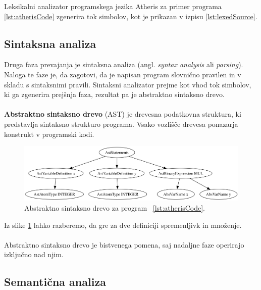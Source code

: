 \documentclass[a4paper, 12p]{book}
\begin{document}
Leksikalni analizator programskega jezika Atheris za primer programa \ref{lst:atherisCode} zgenerira tok simbolov, kot je prikazan v izpisu \ref{lst:lexedSource}.

\subsection{Sintaksna analiza}

Druga faza prevajanja je sintaksna analiza (angl. \textit{syntax analysis} ali \textit{parsing}). Naloga te faze je, da zagotovi, da je napisan program slovnično pravilen in v skladu s sintaksnimi pravili. Sintaksni analizator prejme kot vhod tok simbolov, ki ga zgenerira prejšnja faza, rezultat pa je abstraktno sintaksno drevo. \\\\
\indent\textbf{Abstraktno sintaksno drevo} (AST) je drevesna podatkovna struktura, ki predstavlja sintaksno strukturo programa. Vsako vozlišče drevesa ponazarja konstrukt v programski kodi.\\

\begin{figure}[h]
	\begin{center}
		\includegraphics[width=1\textwidth]{resources/ast.png}
	\end{center}
	\caption{Abstraktno sintaksno drevo za program ~\ref{lst:atherisCode}.}
	\label{image:abstractSyntaxTree}
\end{figure}

Iz slike \ref{image:abstractSyntaxTree} lahko razberemo, da gre za dve definiciji spremenljivk in množenje.\\\\
\indent Abstraktno sintaksno drevo je bistvenega pomena, saj nadaljne faze operirajo izključno nad njim.

\subsection{Semantična analiza}
\end{document}

